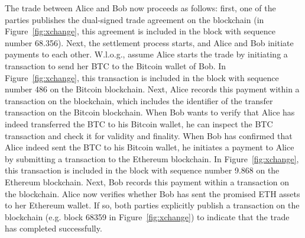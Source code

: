 The trade between Alice and Bob now proceeds as follows: first, one of the parties publishes the dual-signed trade agreement on the \ModelName{} blockchain (in Figure~\ref{fig:xchange}, this agreement is included in the block with sequence number 68.356).
Next, the settlement process starts, and Alice and Bob initiate payments to each other.
W.l.o.g., assume Alice starts the trade by initiating a transaction to send her BTC to the Bitcoin wallet of Bob.
In Figure~\ref{fig:xchange}, this transaction is included in the block with sequence number 486 on the Bitcoin blockchain.
Next, Alice records this payment within a transaction on the \ModelName{} blockchain, which includes the identifier of the transfer transaction on the Bitcoin blockchain.
When Bob wants to verify that Alice has indeed transferred the BTC to his Bitcoin wallet, he can inspect the BTC transaction and check it for validity and finality.
When Bob has confirmed that Alice indeed sent the BTC to his Bitcoin wallet, he initiates a payment to Alice by submitting a transaction to the Ethereum blockchain.
In Figure~\ref{fig:xchange}, this transaction is included in the block with sequence number 9.868 on the Ethereum blockchain.
Next, Bob records this payment within a transaction on the \ModelName{} blockchain.
Alice now verifies whether Bob has sent the promised ETH assets to her Ethereum wallet.
If so, both parties explicitly publish a transaction on the \ModelName{} blockchain (e.g. block 68359 in Figure~\ref{fig:xchange}) to indicate that the trade has completed successfully.

